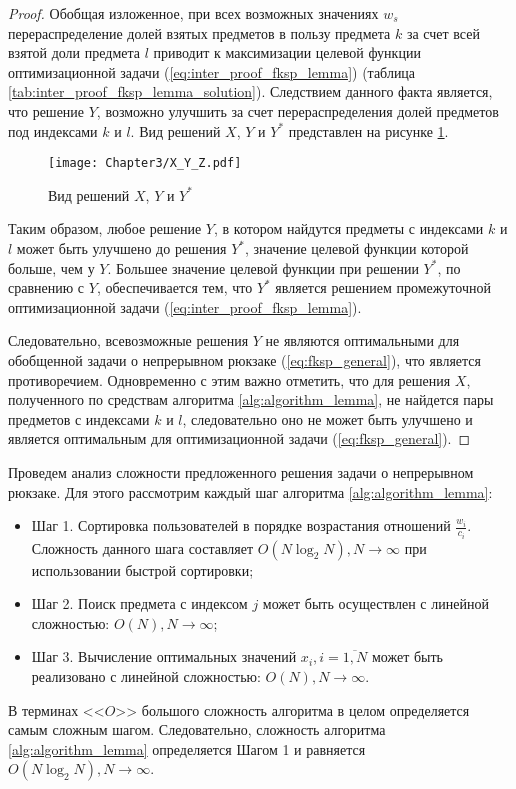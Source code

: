 \begin{proof}
Обобщая изложенное, при всех возможных значениях $w_s$ перераспределение долей взятых предметов в пользу предмета $k$ за счет всей взятой доли предмета $l$ приводит к максимизации целевой функции оптимизационной задачи (\ref{eq:inter_proof_fksp_lemma}) (таблица \ref{tab:inter_proof_fksp_lemma_solution}). Следствием данного факта является, что решение $Y$, возможно улучшить за счет перераспределения долей предметов под индексами $k$ и $l$. Вид решений $X$, $Y$ и $Y^{*}$ представлен на рисунке \ref{fig:X_Y_Ys_Solutions}.

\begin{figure}[htbp]
\begin{center}
\texttt{[image: Chapter3/X\_Y\_Z.pdf]}
\caption{Вид решений $X$, $Y$ и $Y^{*}$}
\label{fig:X_Y_Ys_Solutions}
\end{center}
\end{figure}

Таким образом, любое решение $Y$, в котором найдутся предметы с индексами $k$ и $l$ может быть улучшено до решения $Y^{*}$, значение целевой функции которой больше, чем у $Y$. Большее значение целевой функции при решении $Y^{*}$, по сравнению с $Y$, обеспечивается тем, что $Y^{*}$ является решением промежуточной оптимизационной задачи (\ref{eq:inter_proof_fksp_lemma}).

Следовательно, всевозможные решения $Y$ не являются оптимальными для обобщенной задачи о непрерывном рюкзаке (\ref{eq:fksp_general}), что является противоречием. Одновременно с этим важно отметить, что для решения $X$, полученного по средствам алгоритма \ref{alg:algorithm_lemma}, не найдется пары предметов с индексами $k$ и $l$, следовательно оно не может быть улучшено и является оптимальным для оптимизационной задачи (\ref{eq:fksp_general}).
\end{proof}

Проведем анализ сложности предложенного решения задачи о непрерывном рюкзаке. Для этого рассмотрим каждый шаг алгоритма \ref{alg:algorithm_lemma}:
\begin{itemize}
	\item Шаг 1. Сортировка пользователей в порядке возрастания отношений $\frac{w_i}{c_i}$. Сложность данного шага составляет $O(N \log_2 N), N\to\infty$ при использовании быстрой сортировки;
	\item Шаг 2. Поиск предмета с индексом $j$ может быть осуществлен с линейной сложностью: $O(N), N\to\infty$;
	\item Шаг 3. Вычисление оптимальных значений $x_i, i=\overline{1,N}$ может быть реализовано с линейной сложностью: $O(N), N\to\infty$.
\end{itemize}
В терминах <<$O$>> большого сложность алгоритма в целом определяется самым сложным шагом. Следовательно, сложность алгоритма \ref{alg:algorithm_lemma} определяется Шагом 1 и равняется $O(N \log_2 N), N\to\infty$.

